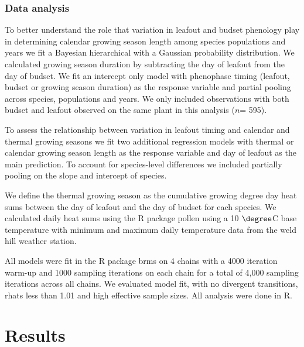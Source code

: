 \documentclass[12 pt]{article}
\begin{document}
\subsubsection{Data analysis}
To better understand the role that variation in leafout and budset phenology play in determining calendar growing season length among species populations and years we fit a Bayesian hierarchical with a Gaussian probability distribution. We calculated growing season duration by subtracting the day of leafout from the day of budset. We fit an intercept only model with phenophase timing (leafout, budset or growing season duration) as the response variable and partial pooling across species, populations and years. We only included observations with both budset and leafout observed on the same plant in this analysis ($n$= 595).

To assess the relationship between variation in leafout timing and calendar and thermal growing seasons we fit two additional regression models with thermal or calendar growing season length as the response variable and day of leafout as the main prediction. To account for species-level differences we included partially pooling on the slope and intercept of species.

We define the thermal growing season as the cumulative growing degree day heat sums between the day of leafout and the day of budset for each species. We calculated daily heat sums using the R package pollen \citep{} using a 10 $\degree$C base temperature with minimum and maximum daily temperature data from the weld hill weather station.

All models were fit in the R package brms on 4 chains with a 4000 iteration warm-up and 1000 sampling iterations on each chain for a total of 4,000 sampling iterations across all chains. We evaluated model fit, with no divergent transitions, rhats less than 1.01 and high effective sample sizes. All analysis were done in R.


\section{Results} %
\end{document}

